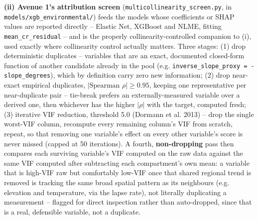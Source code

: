 \textbf{(ii) Avenue 1's attribution screen} (\texttt{multicollinearity\_screen.py}, in
\texttt{models/xgb\_environmental/}) feeds the models whose coefficients or SHAP values are
reported directly -- Elastic Net, XGBoost and NLME, fitting \texttt{mean\_cr\_residual} -- and is
the properly collinearity-controlled companion to (i), used exactly where collinearity control
actually matters. Three stages: (1) drop deterministic duplicates -- variables that are an exact,
documented closed-form function of another candidate already in the pool (e.g.
\texttt{inverse\_slope\_proxy = -slope\_degrees}), which by definition carry zero new information;
(2) drop near-exact empirical duplicates, $|\text{Spearman }\rho|\ge 0.95$, keeping one
representative per near-duplicate pair -- tie-break prefers an externally-measured variable over a
derived one, then whichever has the higher $|\rho|$ with the target, computed fresh; (3) iterative
VIF reduction, threshold 5.0 (Dormann et al. 2013) -- drop the single worst-VIF column, recompute
every remaining column's VIF from scratch, repeat, so that removing one variable's effect on every
other variable's score is never missed (capped at 50 iterations). A fourth, \textbf{non-dropping}
pass then compares each surviving variable's VIF computed on the raw data against the same VIF
computed after subtracting each compartment's own mean: a variable that is high-VIF raw but
comfortably low-VIF once that shared regional trend is removed is tracking the same broad spatial
pattern as its neighbours (e.g. elevation and temperature, via the lapse rate), not literally
duplicating a measurement -- flagged for direct inspection rather than auto-dropped, since that is
a real, defensible variable, not a duplicate.

